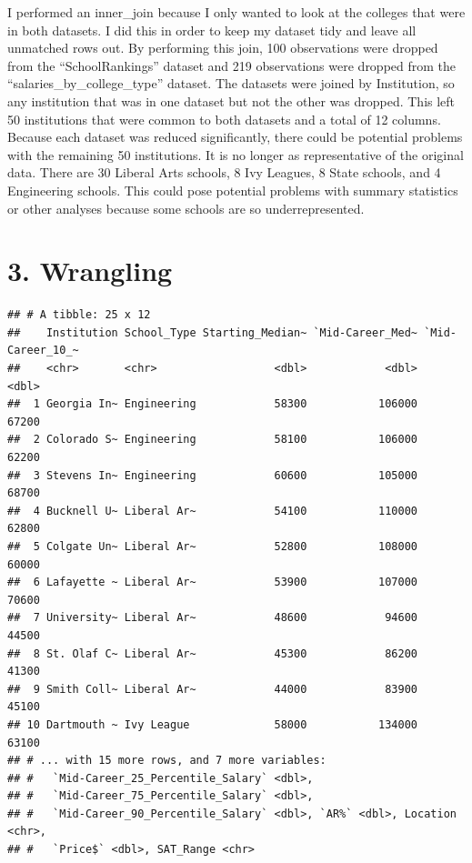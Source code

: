 \documentclass[]{article}
\newenvironment{Shaded}{\begin{snugshade}}{\end{snugshade}}
\newcommand{\KeywordTok}[1]{\textcolor[rgb]{0.13,0.29,0.53}{\textbf{#1}}}
\newcommand{\DataTypeTok}[1]{\textcolor[rgb]{0.13,0.29,0.53}{#1}}
\newcommand{\StringTok}[1]{\textcolor[rgb]{0.31,0.60,0.02}{#1}}
\newcommand{\OperatorTok}[1]{\textcolor[rgb]{0.81,0.36,0.00}{\textbf{#1}}}
\newcommand{\NormalTok}[1]{#1}
\begin{document}
I performed an inner\_join because I only wanted to look at the colleges
that were in both datasets. I did this in order to keep my dataset tidy
and leave all unmatched rows out. By performing this join, 100
observations were dropped from the ``SchoolRankings'' dataset and 219
observations were dropped from the ``salaries\_by\_college\_type''
dataset. The datasets were joined by Institution, so any institution
that was in one dataset but not the other was dropped. This left 50
institutions that were common to both datasets and a total of 12
columns. Because each dataset was reduced significantly, there could be
potential problems with the remaining 50 institutions. It is no longer
as representative of the original data. There are 30 Liberal Arts
schools, 8 Ivy Leagues, 8 State schools, and 4 Engineering schools. This
could pose potential problems with summary statistics or other analyses
because some schools are so underrepresented.

\section{3. Wrangling}\label{wrangling}

\begin{Shaded}
\end{Shaded}

\begin{verbatim}
## # A tibble: 25 x 12
##    Institution School_Type Starting_Median~ `Mid-Career_Med~ `Mid-Career_10_~
##    <chr>       <chr>                  <dbl>            <dbl>            <dbl>
##  1 Georgia In~ Engineering            58300           106000            67200
##  2 Colorado S~ Engineering            58100           106000            62200
##  3 Stevens In~ Engineering            60600           105000            68700
##  4 Bucknell U~ Liberal Ar~            54100           110000            62800
##  5 Colgate Un~ Liberal Ar~            52800           108000            60000
##  6 Lafayette ~ Liberal Ar~            53900           107000            70600
##  7 University~ Liberal Ar~            48600            94600            44500
##  8 St. Olaf C~ Liberal Ar~            45300            86200            41300
##  9 Smith Coll~ Liberal Ar~            44000            83900            45100
## 10 Dartmouth ~ Ivy League             58000           134000            63100
## # ... with 15 more rows, and 7 more variables:
## #   `Mid-Career_25_Percentile_Salary` <dbl>,
## #   `Mid-Career_75_Percentile_Salary` <dbl>,
## #   `Mid-Career_90_Percentile_Salary` <dbl>, `AR%` <dbl>, Location <chr>,
## #   `Price$` <dbl>, SAT_Range <chr>
\end{verbatim}
\end{document}
